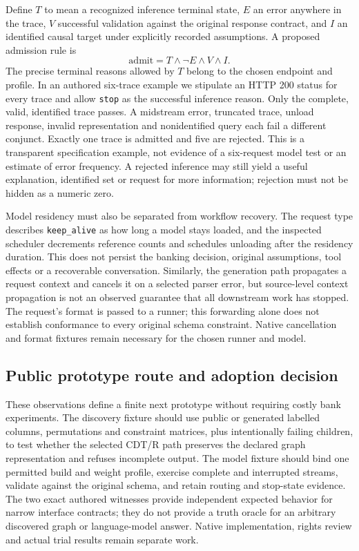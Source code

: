 Define $T$ to mean a recognized inference terminal state, $E$ an error anywhere in the trace,
$V$ successful validation against the original response contract, and $I$ an identified causal
target under explicitly recorded assumptions. A proposed admission rule is
\[
 \mathrm{admit}=T\land\neg E\land V\land I.
\]
The precise terminal reasons allowed by $T$ belong to the chosen endpoint and profile.
In an authored six-trace example we stipulate an HTTP 200 status for every trace and allow
\texttt{stop} as the successful inference reason. Only the complete, valid, identified trace
passes. A midstream error, truncated trace, unload response, invalid representation and
nonidentified query each fail a different conjunct. Exactly one trace is admitted and five are
rejected. This is a transparent specification example, not evidence of a six-request model test
or an estimate of error frequency. A rejected inference may still yield a useful explanation,
identified set or request for more information; rejection must not be hidden as a numeric zero.
\citep{exec28_bp_reference}

Model residency must also be separated from workflow recovery. The request type describes
\texttt{keep\_alive} as how long a model stays loaded, and the inspected scheduler decrements
reference counts and schedules unloading after the residency duration. This does not persist
the banking decision, original assumptions, tool effects or a recoverable conversation.
Similarly, the generation path propagates a request context and cancels it on a selected parser
error, but source-level context propagation is not an observed guarantee that all downstream
work has stopped. The request's format is passed to a runner; this forwarding alone does not
establish conformance to every original schema constraint. Native cancellation and format
fixtures remain necessary for the chosen runner and model.~\citep{exec28_bp_ollama}

\subsection{Public prototype route and adoption decision}
These observations define a finite next prototype without requiring costly bank experiments.
The discovery fixture should use public or generated labelled columns, permutations and
constraint matrices, plus intentionally failing children, to test whether the selected CDT/R
path preserves the declared graph representation and refuses incomplete output. The model
fixture should bind one permitted build and weight profile, exercise complete and interrupted
streams, validate against the original schema, and retain routing and stop-state evidence.
The two exact authored witnesses provide independent expected behavior for narrow interface
contracts; they do not provide a truth oracle for an arbitrary discovered graph or language-model
answer. Native implementation, rights review and actual trial results remain separate work.

